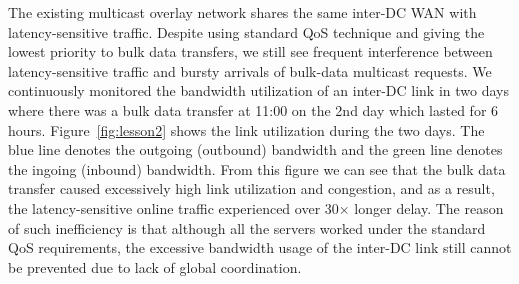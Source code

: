 



The existing multicast overlay network shares the same inter-DC WAN
with latency-sensitive traffic.
Despite using standard QoS technique and giving the lowest priority to
bulk data transfers, we still see frequent interference between
latency-sensitive traffic and bursty arrivals of bulk-data multicast
requests.
We continuously monitored the bandwidth utilization of an inter-DC
link in two days where there was a bulk data transfer at 11:00 on the
2nd day which lasted for 6 hours.
Figure~\ref{fig:lesson2} shows the link utilization during the two
days. The blue line denotes the outgoing (outbound) bandwidth and the green line denotes the ingoing (inbound) bandwidth.
From this figure we can see that the bulk data transfer caused
excessively high link utilization and congestion, and
as a result, the latency-sensitive online traffic experienced over
30$\times$ longer delay.
The reason of such inefficiency is that although all the servers worked under the standard QoS requirements, the excessive bandwidth usage of the inter-DC link still cannot be prevented due
to lack of global coordination.


